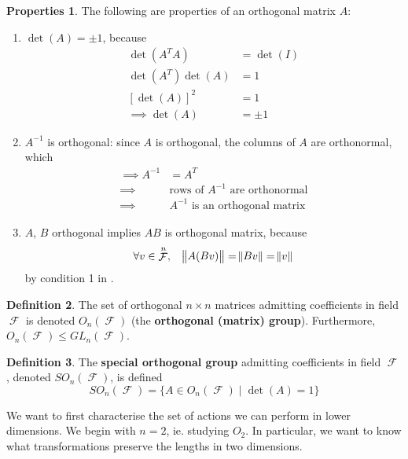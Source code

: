 \documentclass[11pt]{amsart} %
\theoremstyle{definition}
\newtheorem{definition}{Definition}[section]
\newtheorem{properties}[definition]{Properties}
\theoremstyle{definition}
\DeclareMathOperator{\FF}{\mathcal{F}}
\numberwithin{equation}{section}
\begin{document}
\begin{properties}
	The following are properties of an orthogonal matrix $A$:
	\begin{enumerate}%
		\item $ \det (A) = \pm 1$, because
		\begin{align*}
			\det (A^T A) &= \det (I) \\
			\det (A^T) \det (A) &= 1 \\
			[\det (A)]^2 & = 1 \\
			\implies \det (A) &= \pm 1
		\end{align*}
		
		\item $A^{-1}$ is orthogonal: since $A$ is orthogonal, the columns of $A$ are orthonormal, which
		\begin{align*}
		\implies A^{-1} &= A^T \\
		\implies &\text{rows of } A^{-1} \text{ are orthonormal} \\
		\implies & A^{-1} \text{ is an orthogonal matrix}		
		\end{align*}
		
		\item $A$, $B$ orthogonal implies $AB$ is orthogonal matrix, because
		\begin{align*}
		\forall v \in \FF^n, \quad \norm{A(Bv)}  = \norm{Bv} = \norm{v} 
		\end{align*}
		by condition 1 in . 
	\end{enumerate}
\end{properties}

\begin{definition}
	\label{deforthogonalgroup}
	The set of orthogonal $n \times n$ matrices admitting coefficients in field $\FF$ is denoted $O_n (\FF)$ (the \textbf{orthogonal (matrix) group}). Furthermore, $O_n (\FF) \leq GL_n (\FF)$.
\end{definition}

\begin{definition}
	The \textbf{special orthogonal group} admitting coefficients in field $\FF$, denoted $SO_n (\FF)$, is defined
	$$ SO_n (\FF) = \{ A \in O_n (\FF) \mid \det (A) = 1 \} $$
\end{definition}

We want to first characterise the set of actions we can perform in lower dimensions. We begin with $n=2$, ie. studying $O_2$. In particular, we want to know what transformations preserve the lengths in two dimensions.
\end{document}
